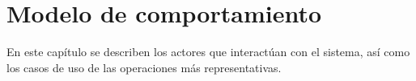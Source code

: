 \chapter{Modelo de comportamiento}	
\label{cap:modComportamiento}

En este capítulo se describen los actores que interactúan con el sistema, así como los casos de uso de las operaciones más representativas.

